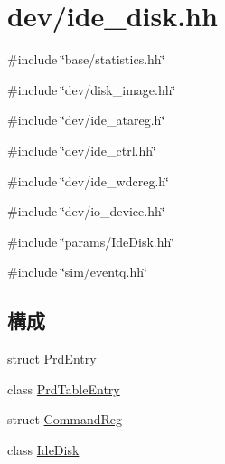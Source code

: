 \hypertarget{ide__disk_8hh}{
\section{dev/ide\_\-disk.hh}
\label{ide__disk_8hh}
}
{\ttfamily \#include \char`\"{}base/statistics.hh\char`\"{}}\par
{\ttfamily \#include \char`\"{}dev/disk\_\-image.hh\char`\"{}}\par
{\ttfamily \#include \char`\"{}dev/ide\_\-atareg.h\char`\"{}}\par
{\ttfamily \#include \char`\"{}dev/ide\_\-ctrl.hh\char`\"{}}\par
{\ttfamily \#include \char`\"{}dev/ide\_\-wdcreg.h\char`\"{}}\par
{\ttfamily \#include \char`\"{}dev/io\_\-device.hh\char`\"{}}\par
{\ttfamily \#include \char`\"{}params/IdeDisk.hh\char`\"{}}\par
{\ttfamily \#include \char`\"{}sim/eventq.hh\char`\"{}}\par
\subsection*{構成}
\begin{DoxyCompactItemize}
\item 
struct \hyperlink{structPrdEntry}{PrdEntry}
\item 
class \hyperlink{classPrdTableEntry}{PrdTableEntry}
\item 
struct \hyperlink{structCommandReg}{CommandReg}
\item 
class \hyperlink{classIdeDisk}{IdeDisk}
\end{DoxyCompactItemize}
